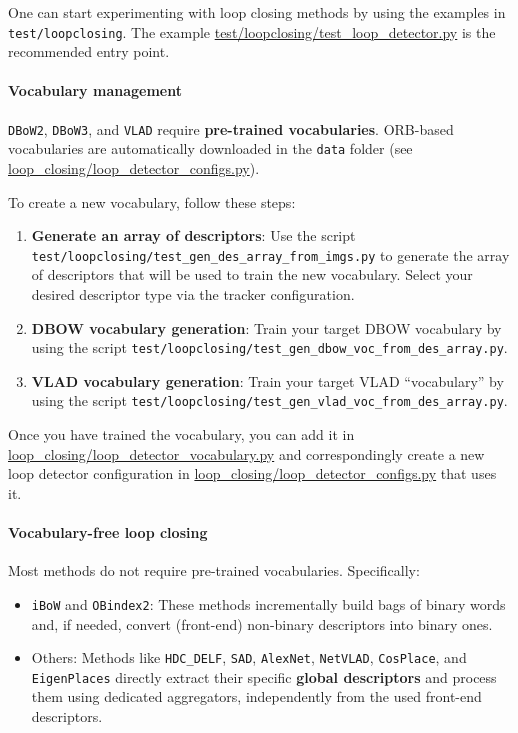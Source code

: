 \documentclass{article}
\let\oldparagraph\paragraph
\renewcommand{\paragraph}[1]{\oldparagraph{#1}\mbox{}}
\begin{document}
One can start experimenting with loop closing methods by using the
examples in \texttt{test/loopclosing}. The example
\href{./test/loopclosing/test_loop_detector.py}{test/loopclosing/test\_loop\_detector.py}
is the recommended entry point.

\hypertarget{vocabulary-management}{%
\paragraph{Vocabulary management}\label{vocabulary-management}}

\texttt{DBoW2}, \texttt{DBoW3}, and \texttt{VLAD} require
\textbf{pre-trained vocabularies}. ORB-based vocabularies are
automatically downloaded in the \texttt{data} folder (see
\url{loop_closing/loop_detector_configs.py}).

To create a new vocabulary, follow these steps:

\begin{enumerate}
\def\labelenumi{\arabic{enumi}.}
\item
  \textbf{Generate an array of descriptors}: Use the script \\
  \texttt{test/loopclosing/test\_gen\_des\_array\_from\_imgs.py} to
  generate the array of descriptors that will be used to train the new
  vocabulary. Select your desired descriptor type via the tracker
  configuration.
\item
  \textbf{DBOW vocabulary generation}: Train your target DBOW vocabulary
  by using the script
  \texttt{test/loopclosing/test\_gen\_dbow\_voc\_from\_des\_array.py}.
\item
  \textbf{VLAD vocabulary generation}: Train your target VLAD
  ``vocabulary'' by using the script
  \texttt{test/loopclosing/test\_gen\_vlad\_voc\_from\_des\_array.py}.
\end{enumerate}

Once you have trained the vocabulary, you can add it in
\url{loop_closing/loop_detector_vocabulary.py} and correspondingly
create a new loop detector configuration in
\url{loop_closing/loop_detector_configs.py} that uses it.

\hypertarget{vocabulary-free-loop-closing}{%
\paragraph{Vocabulary-free loop
closing}\label{vocabulary-free-loop-closing}}

Most methods do not require pre-trained vocabularies. Specifically:
\begin{itemize}
\item \texttt{iBoW} and \texttt{OBindex2}: These methods incrementally build
bags of binary words and, if needed, convert (front-end) non-binary
descriptors into binary ones. 
\item Others: Methods like \texttt{HDC\_DELF},
\texttt{SAD}, \texttt{AlexNet}, \texttt{NetVLAD}, \texttt{CosPlace}, and
\texttt{EigenPlaces} directly extract their specific \textbf{global
descriptors} and process them using dedicated aggregators, independently
from the used front-end descriptors.
\end{itemize}
\end{document}

